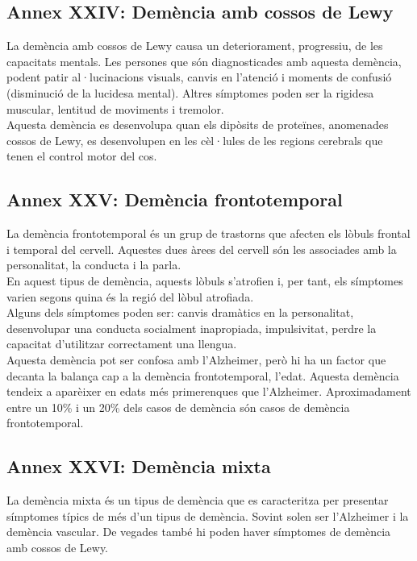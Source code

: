 \documentclass[a4paper,12pt]{article}
\begin{document}
\subsection*{Annex XXIV: Demència amb cossos de Lewy}
La demència amb cossos de Lewy causa un deteriorament, progressiu, de les capacitats mentals. Les persones que són diagnosticades amb aquesta demència, podent patir al·lucinacions visuals, canvis en l'atenció i moments de confusió (disminució de la lucidesa mental). Altres símptomes poden ser la rigidesa muscular, lentitud de moviments i tremolor.\\
Aquesta demència es desenvolupa quan els dipòsits de proteïnes, anomenades cossos de Lewy, es desenvolupen en les cèl·lules de les regions cerebrals que tenen el control motor del cos.
\subsection*{Annex XXV: Demència frontotemporal}
La demència frontotemporal és un grup de trastorns que afecten els lòbuls frontal i temporal del cervell. Aquestes dues àrees del cervell són les associades amb la personalitat, la conducta i la parla.\\
En aquest tipus de demència, aquests lòbuls s'atrofien i, per tant, els símptomes varien segons quina és la regió del lòbul atrofiada.\\
Alguns dels símptomes poden ser: canvis dramàtics en la personalitat, desenvolupar una conducta socialment inapropiada, impulsivitat, perdre la capacitat d'utilitzar correctament una llengua.\\
Aquesta demència pot ser confosa amb l'Alzheimer, però hi ha un factor que decanta la balança cap a la demència frontotemporal, l'edat. Aquesta demència tendeix a aparèixer en edats més primerenques que l'Alzheimer. Aproximadament entre un 10\% i un 20\% dels casos de demència són casos de demència frontotemporal.
\subsection*{Annex XXVI: Demència mixta}
La demència mixta és un tipus de demència que es caracteritza per presentar símptomes típics de més d'un tipus de demència. Sovint solen ser l'Alzheimer i la demència vascular. De vegades també hi poden haver símptomes de demència amb cossos de Lewy.
\end{document}
